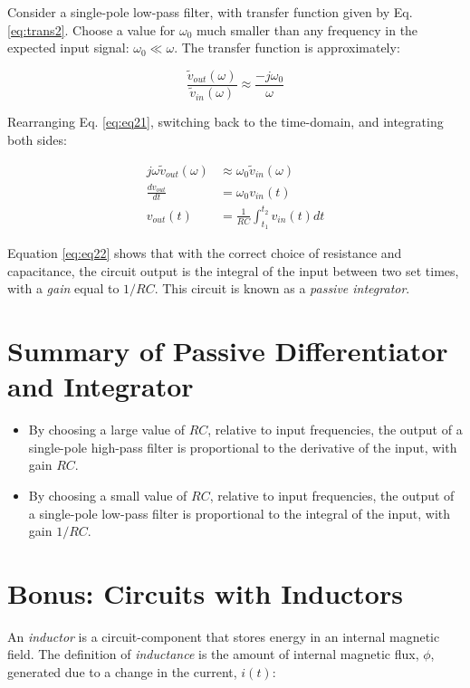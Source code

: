 \documentclass[12pt]{article}
\begin{document}
Consider a single-pole low-pass filter, with transfer function given by Eq. \ref{eq:trans2}.  Choose a value for $\omega_0$ much smaller than any frequency in the expected input signal: $\omega_0 \ll \omega$.  The transfer function is approximately:

\begin{equation}
\frac{\tilde{v}_{out}(\omega)}{\tilde{v}_{in}(\omega)} \approx \frac{-j\omega_0}{\omega}
\label{eq:eq21}
\end{equation}

Rearranging Eq. \ref{eq:eq21}, switching back to the time-domain, and integrating both sides:

\begin{align}
j\omega \tilde{v}_{out}(\omega) &\approx \omega_0 \tilde{v}_{in}(\omega) \\
\frac{dv_{out}}{dt} &= \omega_0 v_{in}(t) \\
v_{out}(t) &= \frac{1}{RC} \int_{t_1}^{t_2} v_{in}(t) dt
\label{eq:eq22}
\end{align}

Equation \ref{eq:eq22} shows that with the correct choice of resistance and capacitance, the circuit output is the integral of the input between two set times, with a \textit{gain} equal to $1/RC$.  This circuit is known as a \textit{passive integrator}.

\section{Summary of Passive Differentiator and Integrator}

\begin{itemize}
\item By choosing a large value of $RC$, relative to input frequencies, the output of a single-pole high-pass filter is proportional to the derivative of the input, with gain $RC$.
\item By choosing a small value of $RC$, relative to input frequencies, the output of a single-pole low-pass filter is proportional to the integral of the input, with gain $1/RC$.
\end{itemize}

\section{Bonus: Circuits with Inductors}

An \textit{inductor} is a circuit-component that stores energy in an internal magnetic field.  The definition of \textit{inductance} is the amount of internal magnetic flux, $\phi$, generated due to a change in the current, $i(t)$:
\end{document}
